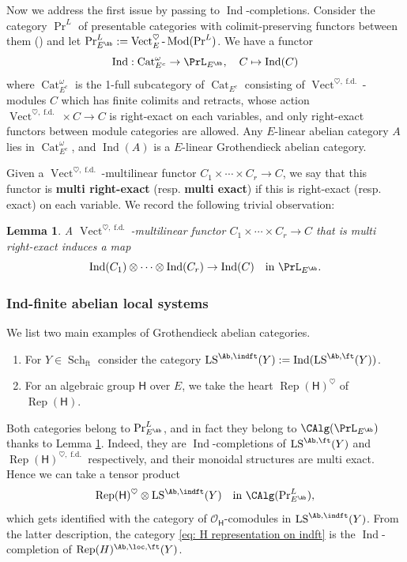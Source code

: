 \documentclass[10pt]{amsart}
\newcommand{\sssec}{\subsubsection}
\newtheorem{lemma}[subsubsection]{Lemma}
\theoremstyle{remark}
\newcommand{\te}{\text}
\newcommand{\on}{\operatorname}
\newcommand{\cO}{\mathcal{O}}
\newcommand{\Cat}{\on{Cat}}
\newcommand{\CatEc}{\Cat_{E^c}}
\newcommand{\lMod}{\text{-}\on{Mod}}
\newcommand{\Rep}{\on{Rep}}
\newcommand{\Vect}{\on{Vect}}
\newcommand{\LS}{\on{LS}}
\newcommand{\Schft}{\on{Sch}_{\on{ft}}}
\DeclareMathOperator{\Ind}{Ind}
\begin{document}
\sssec{}\label{sssec: Ind completion Ec}
Now we address the first issue by passing to $\Ind$-completions. Consider the category $\Pr^L$ of presentable categories with colimit-preserving functors between them (\cite[Definition 5.5.3.1]{HTT}) and let $\Pr^L_{E^{\Ab}}:=\Vect^{\heartsuit}_E\lMod(\Pr^L)$. We have a functor
\begin{equation}\label{eq: Ind completion for oneCatEc}
    \Ind: \CatEc^{\omega}\rightarrow \PrL_{E^{\Ab}},\quad C\mapsto \Ind(C)
\end{equation}
where $\CatEc^{\omega}$ is the 1-full subcategory of $\CatEc$ consisting of $\Vect^{\heartsuit,\on{f.d.}}$-modules $C$ which has finite colimits and retracts, whose action $\Vect^{\heartsuit,\on{f.d.}}\times C\rightarrow C$ is right-exact on each variables, and only right-exact functors between module categories are allowed. Any $E$-linear abelian category $A$ lies in $\CatEc^{\omega}$, and $\Ind(A)$ is a $E$-linear Grothendieck abelian category. 
\medskip

Given a $\Vect^{\heartsuit,\on{f.d.}}$-multilinear functor $C_1\times \cdots \times C_r\rightarrow C$, we say that this functor is \textbf{multi right-exact} (resp. \textbf{multi exact}) if this is right-exact (resp. exact) on each variable. We record the following trivial observation: 

\begin{lemma}\label{lem: functoriality of Ind}
    A $\Vect^{\heartsuit,\on{f.d.}}$-multilinear functor $C_1\times \cdots \times C_r\rightarrow C$ that is multi right-exact induces a map
\[\Ind(C_1)\otimes\cdots \otimes \Ind(C_r)\rightarrow\Ind(C)\quad\te{in }\PrL_{E^{\Ab}}.\]
\end{lemma}



\sssec{Ind-finite abelian local systems}\label{sssec: ind-finite ab loc}
We list two main examples of Grothendieck abelian categories.
\begin{enumerate}
    \item For $Y\in\Schft$ consider the category $\LS^{\Ab,\indft}(Y):=\Ind(\LS^{\Ab,\ft}(Y))$.
    \item For an algebraic group $\mathsf{H}$ over $E$, we take the heart $\Rep(\mathsf{H})^{\heartsuit}$ of $\Rep(\mathsf{H})$.
\end{enumerate}
Both categories belong to $\Pr^L_{E^{\Ab}}$, and in fact they belong to $\CAlg(\PrL_{E^{\Ab}})$ thanks to Lemma \ref{lem: functoriality of Ind}. Indeed, they are $\Ind$-completions of $\LS^{\Ab,\ft}(Y)$ and $\Rep(\mathsf{H})^{\heartsuit,\on{f.d.}}$ respectively, and their monoidal structures are multi exact.
Hence we can take a tensor product
\begin{equation}\label{eq: H representation on indft}
    \Rep(\mathsf{H})^{\heartsuit}\otimes \LS^{\Ab,\indft}(Y) \quad \te{in } \CAlg(\on{Pr}^L_{E^{\Ab}}),
\end{equation}
which gets identified with the category of $\cO_{\mathsf{H}}$-comodules in $\LS^{\Ab,\indft}(Y)$. From the latter description, the category \eqref{eq: H representation on indft} is the $\Ind$-completion of $\Rep(H)^{\Ab,\loc,\ft}(Y)$.
\medskip
\end{document}
